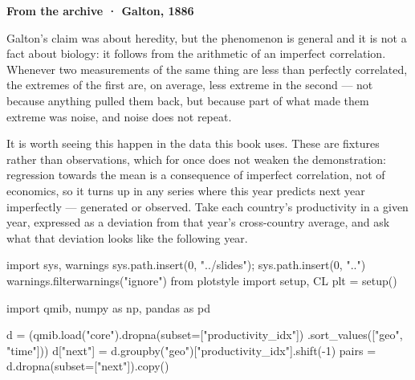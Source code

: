 \documentclass[
  letterpaper,
  10pt,
  twoside,
  openright,
  numbers=noenddot,
  chapterprefix=true]{scrbook}
\newenvironment{Shaded}{}{}
\newcommand{\DecValTok}[1]{\textcolor[rgb]{0.00,0.36,0.77}{#1}}
\newcommand{\ImportTok}[1]{\textcolor[rgb]{0.01,0.18,0.38}{#1}}
\newcommand{\NormalTok}[1]{\textcolor[rgb]{0.14,0.16,0.18}{#1}}
\newcommand{\OperatorTok}[1]{\textcolor[rgb]{0.14,0.16,0.18}{#1}}
\newcommand{\StringTok}[1]{\textcolor[rgb]{0.01,0.18,0.38}{#1}}
\newenvironment{qmibarchive}
  {\par\medskip\noindent{\color{econgold}\rule{\linewidth}{1.4pt}}%
   \par\nobreak\vspace{4pt}\noindent\ignorespaces}
  {\par\vspace{2pt}\noindent{\color{econrule}\rule{\linewidth}{0.4pt}}\par\medskip}
\begin{document}
\begin{qmibarchive}

\textbf{From the archive · Galton, 1886}

Galton's claim was about heredity, but the phenomenon is general and it
is not a fact about biology: it follows from the arithmetic of an
imperfect correlation. Whenever two measurements of the same thing are
less than perfectly correlated, the extremes of the first are, on
average, less extreme in the second --- not because anything pulled them
back, but because part of what made them extreme was noise, and noise
does not repeat.

It is worth seeing this happen in the data this book uses. These are
fixtures rather than observations, which for once does not weaken the
demonstration: regression towards the mean is a consequence of imperfect
correlation, not of economics, so it turns up in any series where this
year predicts next year imperfectly --- generated or observed. Take each
country's productivity in a given year, expressed as a deviation from
that year's cross-country average, and ask what that deviation looks
like the following year.

\begin{Shaded}
\begin{Highlighting}[]
\ImportTok{import}\NormalTok{ sys, warnings}
\NormalTok{sys.path.insert(}\DecValTok{0}\NormalTok{, }\StringTok{"../slides"}\NormalTok{)}\OperatorTok{;}\NormalTok{ sys.path.insert(}\DecValTok{0}\NormalTok{, }\StringTok{".."}\NormalTok{)}
\NormalTok{warnings.filterwarnings(}\StringTok{"ignore"}\NormalTok{)}
\ImportTok{from}\NormalTok{ plotstyle }\ImportTok{import}\NormalTok{ setup, CL}
\NormalTok{plt }\OperatorTok{=}\NormalTok{ setup()}

\ImportTok{import}\NormalTok{ qmib, numpy }\ImportTok{as}\NormalTok{ np, pandas }\ImportTok{as}\NormalTok{ pd}

\NormalTok{d }\OperatorTok{=}\NormalTok{ (qmib.load(}\StringTok{"core"}\NormalTok{).dropna(subset}\OperatorTok{=}\NormalTok{[}\StringTok{"productivity\_idx"}\NormalTok{])}
\NormalTok{     .sort\_values([}\StringTok{"geo"}\NormalTok{, }\StringTok{"time"}\NormalTok{]))}
\NormalTok{d[}\StringTok{"next"}\NormalTok{] }\OperatorTok{=}\NormalTok{ d.groupby(}\StringTok{"geo"}\NormalTok{)[}\StringTok{"productivity\_idx"}\NormalTok{].shift(}\OperatorTok{{-}}\DecValTok{1}\NormalTok{)}
\NormalTok{pairs }\OperatorTok{=}\NormalTok{ d.dropna(subset}\OperatorTok{=}\NormalTok{[}\StringTok{"next"}\NormalTok{]).copy()}


\end{Highlighting}
\end{Shaded}
\end{qmibarchive}
\end{document}

